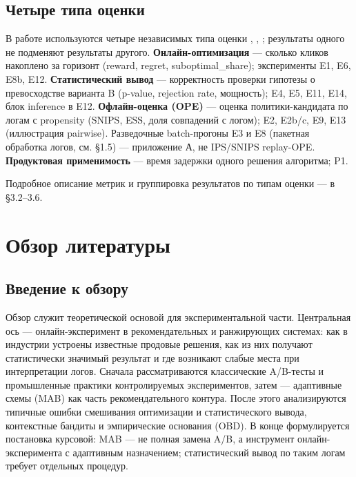 \subsection{Четыре типа оценки}\label{ux447ux435ux442ux44bux440ux435-ux442ux438ux43fux430-ux43eux446ux435ux43dux43aux438}

В работе используются четыре независимых типа оценки \cite{ref12}, \cite{ref13}, \cite{ref21}; результаты одного не подменяют результаты другого. \textbf{Онлайн-оптимизация} --- сколько кликов накоплено за горизонт (reward, regret, suboptimal\_share); эксперименты E1, E6, E8b, E12. \textbf{Статистический вывод} --- корректность проверки гипотезы о превосходстве варианта B (p-value, rejection rate, мощность); E4, E5, E11, E14, блок inference в E12. \textbf{Офлайн-оценка (OPE)} --- оценка политики-кандидата по логам с propensity (SNIPS, ESS, доля совпадений с логом); E2, E2b/c, E9, E13 (иллюстрация pairwise). Разведочные batch-прогоны E3 и E8 (пакетная обработка логов, см. §1.5) --- приложение А, не IPS/SNIPS replay-OPE. \textbf{Продуктовая применимость} --- время задержки одного решения алгоритма; P1.

Подробное описание метрик и группировка результатов по типам оценки --- в §3.2--3.6.

\section{Обзор литературы}\label{ux433ux43bux430ux432ux430-2.-ux43eux431ux437ux43eux440-ux43bux438ux442ux435ux440ux430ux442ux443ux440ux44b}

\subsection{Введение к обзору}\label{ux432ux432ux435ux434ux435ux43dux438ux435-ux43a-ux43eux431ux437ux43eux440ux443}

Обзор служит теоретической основой для экспериментальной части. Центральная ось --- онлайн-эксперимент в рекомендательных и ранжирующих системах: как в индустрии устроены известные продовые решения, как из них получают статистически значимый результат и где возникают слабые места при интерпретации логов. Сначала рассматриваются классические A/B-тесты и промышленные практики контролируемых экспериментов, затем --- адаптивные схемы (MAB) как часть рекомендательного контура. После этого анализируются типичные ошибки смешивания оптимизации и статистического вывода, контекстные бандиты и эмпирические основания (OBD). В конце формулируется постановка курсовой: MAB --- не полная замена A/B, а инструмент онлайн-эксперимента с адаптивным назначением; статистический вывод по таким логам требует отдельных процедур.

